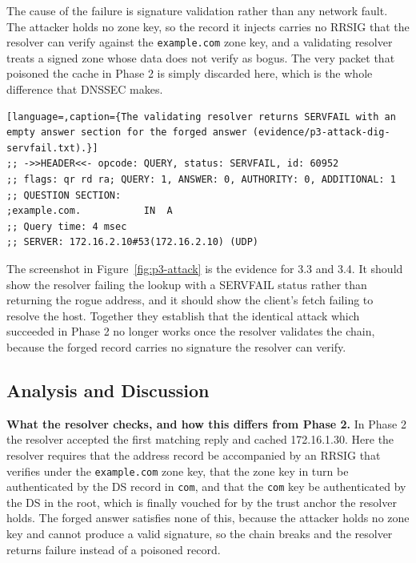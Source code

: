 \documentclass[11pt]{article}
\begin{document}
The cause of the failure is signature validation rather than any network fault. The
attacker holds no zone key, so the record it injects carries no RRSIG that the
resolver can verify against the \texttt{example.com} zone key, and a validating
resolver treats a signed zone whose data does not verify as bogus. The very packet
that poisoned the cache in Phase 2 is simply discarded here, which is the whole
difference that DNSSEC makes.

\begin{lstlisting}[language=,caption={The validating resolver returns SERVFAIL with an empty answer section for the forged answer (evidence/p3-attack-dig-servfail.txt).}]
;; ->>HEADER<<- opcode: QUERY, status: SERVFAIL, id: 60952
;; flags: qr rd ra; QUERY: 1, ANSWER: 0, AUTHORITY: 0, ADDITIONAL: 1
;; QUESTION SECTION:
;example.com.			IN	A
;; Query time: 4 msec
;; SERVER: 172.16.2.10#53(172.16.2.10) (UDP)
\end{lstlisting}


The screenshot in Figure~\ref{fig:p3-attack} is the evidence for 3.3 and 3.4. It
should show the resolver failing the lookup with a SERVFAIL status rather than
returning the rogue address, and it should show the client's fetch failing to
resolve the host. Together they establish that the identical attack which succeeded
in Phase 2 no longer works once the resolver validates the chain, because the
forged record carries no signature the resolver can verify.

\subsection{Analysis and Discussion}

\textbf{What the resolver checks, and how this differs from Phase 2.} In Phase 2
the resolver accepted the first matching reply and cached 172.16.1.30. Here the
resolver requires that the address record be accompanied by an RRSIG that verifies
under the \texttt{example.com} zone key, that the zone key in turn be authenticated
by the DS record in \texttt{com}, and that the \texttt{com} key be authenticated by
the DS in the root, which is finally vouched for by the trust anchor the resolver
holds. The forged answer satisfies none of this, because the attacker holds no zone
key and cannot produce a valid signature, so the chain breaks and the resolver
returns failure instead of a poisoned record.
\end{document}
